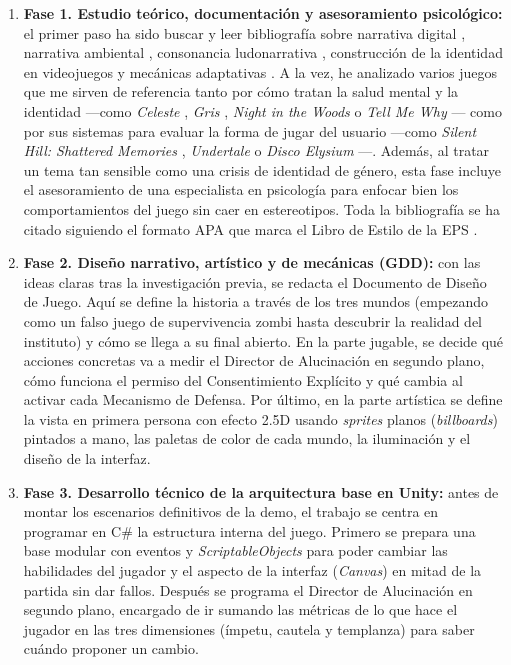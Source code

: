 \begin{enumerate}
  \item \textbf{Fase 1. Estudio teórico, documentación y asesoramiento psicológico:} el primer paso ha sido buscar y leer bibliografía sobre narrativa digital \parencite{navarro2023}, narrativa ambiental \parencite{finestrat2018, boyero2025}, consonancia ludonarrativa \parencite{hernandez2024}, construcción de la identidad en videojuegos \parencite{cuadrado2020, gomez2026} y mecánicas adaptativas \parencite{tremblay2010, renderhub2023}. A la vez, he analizado varios juegos que me sirven de referencia tanto por cómo tratan la salud mental y la identidad —como \textit{Celeste} \parencite{maddy2018}, \textit{Gris} \parencite{nomada2018}, \textit{Night in the Woods} \parencite{infinitefall2017} o \textit{Tell Me Why} \parencite{dontnod2020}— como por sus sistemas para evaluar la forma de jugar del usuario —como \textit{Silent Hill: Shattered Memories} \parencite{climax2009}, \textit{Undertale} \parencite{fox2015} o \textit{Disco Elysium} \parencite{zaum2020}—. Además, al tratar un tema tan sensible como una crisis de identidad de género, esta fase incluye el asesoramiento de una especialista en psicología para enfocar bien los comportamientos del juego sin caer en estereotipos. Toda la bibliografía se ha citado siguiendo el formato APA que marca el Libro de Estilo de la \ac{EPS} \parencite{eps2015}.
  \item \textbf{Fase 2. Diseño narrativo, artístico y de mecánicas (\ac{GDD}):} con las ideas claras tras la investigación previa, se redacta el Documento de Diseño de Juego. Aquí se define la historia a través de los tres mundos (empezando como un falso juego de supervivencia zombi hasta descubrir la realidad del instituto) y cómo se llega a su final abierto. En la parte jugable, se decide qué acciones concretas va a medir el Director de Alucinación en segundo plano, cómo funciona el permiso del Consentimiento Explícito y qué cambia al activar cada Mecanismo de Defensa. Por último, en la parte artística se define la vista en primera persona con efecto 2.5D usando \textit{sprites} planos (\textit{billboards}) pintados a mano, las paletas de color de cada mundo, la iluminación y el diseño de la interfaz.
  \item \textbf{Fase 3. Desarrollo técnico de la arquitectura base en Unity:} antes de montar los escenarios definitivos de la demo, el trabajo se centra en programar en C\# la estructura interna del juego. Primero se prepara una base modular con eventos y \textit{ScriptableObjects} para poder cambiar las habilidades del jugador y el aspecto de la interfaz (\textit{Canvas}) en mitad de la partida sin dar fallos. Después se programa el Director de Alucinación en segundo plano, encargado de ir sumando las métricas de lo que hace el jugador en las tres dimensiones (ímpetu, cautela y templanza) para saber cuándo proponer un cambio.

\end{enumerate}
